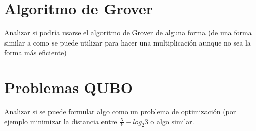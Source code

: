 \section{Algoritmo de Grover}
Analizar si podría usarse el algoritmo de Grover de alguna forma (de una forma similar a como se puede utilizar para hacer una multiplicación aunque no sea la forma más eficiente) 





\section{Problemas QUBO}
Analizar si se puede formular algo como un problema de optimización (por ejemplo minimizar la distancia entre $\frac{X}{Y}-log_2 3$ o algo similar.
